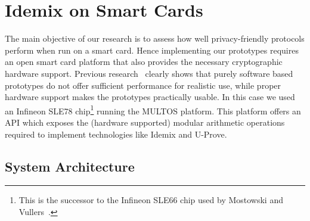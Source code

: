 \section{Idemix on Smart Cards}

The main objective of our research is to assess how well privacy-friendly
protocols perform when run on a smart card. Hence implementing our prototypes
requires an open smart card platform that also provides the necessary
cryptographic hardware support. Previous
research~\cite{TewsJacobs09,MostowskiVullers11} clearly shows that purely
software based prototypes do not offer sufficient performance for realistic
use, while proper hardware support makes the prototypes practically usable. In
this case we used an Infineon SLE78 chip\footnote{This is the successor to the
Infineon SLE66 chip used by Mostowski and Vullers~\cite{MostowskiVullers11}.}
running the MULTOS platform. This platform offers an API which exposes the
(hardware supported) modular arithmetic operations required to implement
technologies like Idemix and U-Prove.

\subsection{System Architecture}

